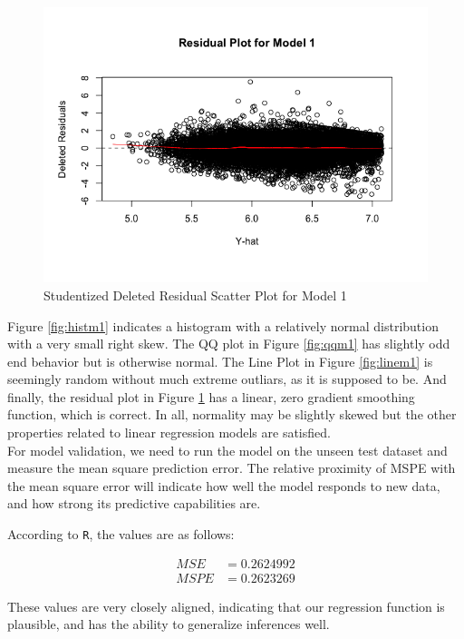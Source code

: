\documentclass{article}
\begin{document}
\begin{figure}[H]
\begin{minipage}{.45\textwidth}
          \includegraphics[scale=0.35]{selection/scatterm1}
          \caption{Studentized Deleted Residual Scatter Plot for Model 1}
          \label{fig:scatterm1}
        \end{minipage}
      \end{figure}

      Figure \ref{fig:histm1} indicates a histogram with a relatively normal
      distribution with a very small right skew. The QQ plot in Figure
      \ref{fig:qqm1} has slightly odd end behavior but is otherwise normal.
      The Line Plot in Figure \ref{fig:linem1} is seemingly random without
      much extreme outliars, as it is supposed to be. And finally, the
      residual plot in Figure \ref{fig:scatterm1} has a linear, zero gradient
      smoothing function, which is correct. In all, normality may be slightly
      skewed but the other properties related to linear regression models are
      satisfied. \\

      For model validation, we need to run the model on the unseen test dataset and
      measure the mean square prediction error. The relative proximity of MSPE with
      the mean square error will indicate how well the model responds to new data,
      and how strong its predictive capabilities are.

      According to \texttt{R}, the values are as follows:

      \begin{align*}
        MSE &= 0.2624992 \\
        MSPE &= 0.2623269
      \end{align*}

      These values are very closely aligned, indicating that our regression function
      is plausible, and has the ability to generalize inferences well.
\end{document}
